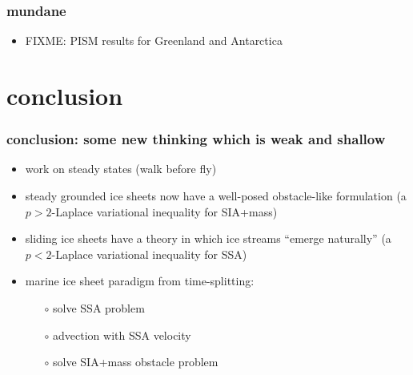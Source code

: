 \documentclass{beamer}
\begin{document}
\begin{frame}
  \frametitle{mundane}

\begin{itemize}
\item FIXME: PISM results for Greenland and Antarctica
\end{itemize}
\end{frame}


\section*{conclusion}

\begin{frame}
  \frametitle{conclusion: some new thinking which is weak and shallow}

\begin{itemize}
\item work on steady states (walk before fly)
\item steady grounded ice sheets now have a well-posed obstacle-like formulation (a $p>2$-Laplace variational inequality for SIA+mass)
\item sliding ice sheets have a theory in which ice streams ``emerge naturally'' (a $p<2$-Laplace variational inequality for SSA)
\item marine ice sheet paradigm from time-splitting:
  \begin{itemize}
  \item[$\circ$]  solve SSA problem
  \item[$\circ$]  advection with SSA velocity
  \item[$\circ$]  solve SIA+mass obstacle problem
  \end{itemize}
\end{itemize}
\end{frame}



\end{document}
